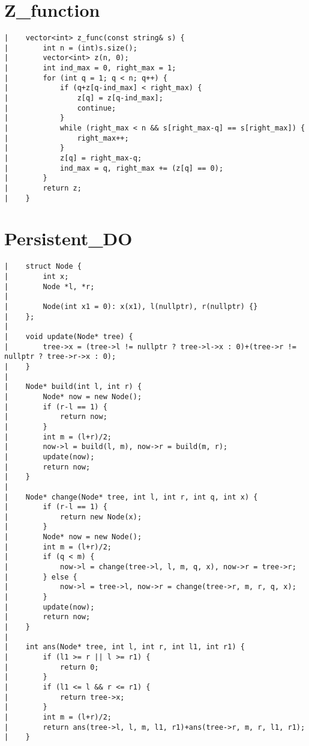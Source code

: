 \documentclass[a4paper, 10pt]{article}
\begin{document}
\begin{center}
\newpage
\section*{Z\_function}
\begin{verbatim}
|    vector<int> z_func(const string& s) {
|        int n = (int)s.size();
|        vector<int> z(n, 0);
|        int ind_max = 0, right_max = 1;
|        for (int q = 1; q < n; q++) {
|            if (q+z[q-ind_max] < right_max) {
|                z[q] = z[q-ind_max];
|                continue;
|            }
|            while (right_max < n && s[right_max-q] == s[right_max]) {
|                right_max++;
|            }
|            z[q] = right_max-q;
|            ind_max = q, right_max += (z[q] == 0);
|        }
|        return z;
|    }
\end{verbatim}

\section*{Persistent\_DO}
\begin{verbatim}
|    struct Node {
|        int x;
|        Node *l, *r;
|    
|        Node(int x1 = 0): x(x1), l(nullptr), r(nullptr) {}
|    };
|    
|    void update(Node* tree) {
|        tree->x = (tree->l != nullptr ? tree->l->x : 0)+(tree->r != nullptr ? tree->r->x : 0);
|    }
|    
|    Node* build(int l, int r) {
|        Node* now = new Node();
|        if (r-l == 1) {
|            return now;
|        }
|        int m = (l+r)/2;
|        now->l = build(l, m), now->r = build(m, r);
|        update(now);
|        return now;
|    }
|    
|    Node* change(Node* tree, int l, int r, int q, int x) {
|        if (r-l == 1) {
|            return new Node(x);
|        }
|        Node* now = new Node();
|        int m = (l+r)/2;
|        if (q < m) {
|            now->l = change(tree->l, l, m, q, x), now->r = tree->r;
|        } else {
|            now->l = tree->l, now->r = change(tree->r, m, r, q, x);
|        }
|        update(now);
|        return now;
|    }
|    
|    int ans(Node* tree, int l, int r, int l1, int r1) {
|        if (l1 >= r || l >= r1) {
|            return 0;
|        }
|        if (l1 <= l && r <= r1) {
|            return tree->x;
|        }
|        int m = (l+r)/2;
|        return ans(tree->l, l, m, l1, r1)+ans(tree->r, m, r, l1, r1);
|    }
\end{verbatim}


\end{center}
\end{document}
